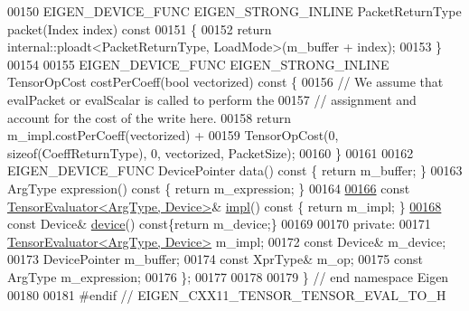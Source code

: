 \begin{DoxyCode}
00150   EIGEN\_DEVICE\_FUNC EIGEN\_STRONG\_INLINE PacketReturnType packet(Index index)\textcolor{keyword}{ const}
00151 \textcolor{keyword}{  }\{
00152     \textcolor{keywordflow}{return} internal::ploadt<PacketReturnType, LoadMode>(m\_buffer + index);
00153   \}
00154 
00155   EIGEN\_DEVICE\_FUNC EIGEN\_STRONG\_INLINE TensorOpCost costPerCoeff(\textcolor{keywordtype}{bool} vectorized)\textcolor{keyword}{ const }\{
00156     \textcolor{comment}{// We assume that evalPacket or evalScalar is called to perform the}
00157     \textcolor{comment}{// assignment and account for the cost of the write here.}
00158     \textcolor{keywordflow}{return} m\_impl.costPerCoeff(vectorized) +
00159         TensorOpCost(0, \textcolor{keyword}{sizeof}(CoeffReturnType), 0, vectorized, PacketSize);
00160   \}
00161 
00162   EIGEN\_DEVICE\_FUNC DevicePointer data()\textcolor{keyword}{ const }\{ \textcolor{keywordflow}{return} m\_buffer; \}
00163   ArgType expression()\textcolor{keyword}{ const }\{ \textcolor{keywordflow}{return} m\_expression; \}
00164 
\hyperlink{struct_eigen_1_1_tensor_evaluator_3_01const_01_tensor_eval_to_op_3_01_arg_type_00_01_make_pointer___01_4_00_01_device_01_4_a29fc7dbf9a2957f1e2ece1b2bdf33159}{00166}   \textcolor{keyword}{const} \hyperlink{struct_eigen_1_1_tensor_evaluator}{TensorEvaluator<ArgType, Device>}& \hyperlink{struct_eigen_1_1_tensor_evaluator_3_01const_01_tensor_eval_to_op_3_01_arg_type_00_01_make_pointer___01_4_00_01_device_01_4_a29fc7dbf9a2957f1e2ece1b2bdf33159}{impl}()\textcolor{keyword}{ const }\{ \textcolor{keywordflow}{return} m\_impl;
       \}
\hyperlink{struct_eigen_1_1_tensor_evaluator_3_01const_01_tensor_eval_to_op_3_01_arg_type_00_01_make_pointer___01_4_00_01_device_01_4_a6a4c3f1f7993a251f2bd46b9c4498e2f}{00168}   \textcolor{keyword}{const} Device& \hyperlink{struct_eigen_1_1_tensor_evaluator_3_01const_01_tensor_eval_to_op_3_01_arg_type_00_01_make_pointer___01_4_00_01_device_01_4_a6a4c3f1f7993a251f2bd46b9c4498e2f}{device}()\textcolor{keyword}{ const}\{\textcolor{keywordflow}{return} m\_device;\}
00169 
00170  \textcolor{keyword}{private}:
00171   \hyperlink{struct_eigen_1_1_tensor_evaluator}{TensorEvaluator<ArgType, Device>} m\_impl;
00172   \textcolor{keyword}{const} Device& m\_device;
00173   DevicePointer m\_buffer;
00174   \textcolor{keyword}{const} XprType& m\_op;
00175   \textcolor{keyword}{const} ArgType m\_expression;
00176 \};
00177 
00178 
00179 \} \textcolor{comment}{// end namespace Eigen}
00180 
00181 \textcolor{preprocessor}{#endif // EIGEN\_CXX11\_TENSOR\_TENSOR\_EVAL\_TO\_H}
\end{DoxyCode}
